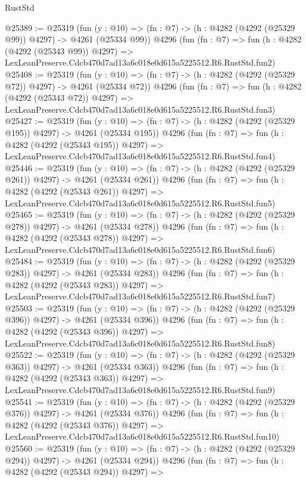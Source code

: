 \begin{lexlean}{RustStd}
\begin{coremodule}
@25389 := @25319
    (fun (y : @10) => (fn : @7) -> (h : @4282 (@4292 (@25329 @99)) @4297) -> @4261 (@25334 @99))
    @4296
    (fun (fn : @7) =>
    fun (h : @4282 (@4292 (@25343 @99)) @4297) =>
    LexLeanPreserve.Cdcb470d7ad13a6c018e0d615a5225512.R6.RustStd.fun2)
@25408 := @25319
    (fun (y : @10) => (fn : @7) -> (h : @4282 (@4292 (@25329 @72)) @4297) -> @4261 (@25334 @72))
    @4296
    (fun (fn : @7) =>
    fun (h : @4282 (@4292 (@25343 @72)) @4297) =>
    LexLeanPreserve.Cdcb470d7ad13a6c018e0d615a5225512.R6.RustStd.fun3)
@25427 := @25319
    (fun (y : @10) => (fn : @7) -> (h : @4282 (@4292 (@25329 @195)) @4297) -> @4261 (@25334 @195))
    @4296
    (fun (fn : @7) =>
    fun (h : @4282 (@4292 (@25343 @195)) @4297) =>
    LexLeanPreserve.Cdcb470d7ad13a6c018e0d615a5225512.R6.RustStd.fun4)
@25446 := @25319
    (fun (y : @10) => (fn : @7) -> (h : @4282 (@4292 (@25329 @261)) @4297) -> @4261 (@25334 @261))
    @4296
    (fun (fn : @7) =>
    fun (h : @4282 (@4292 (@25343 @261)) @4297) =>
    LexLeanPreserve.Cdcb470d7ad13a6c018e0d615a5225512.R6.RustStd.fun5)
@25465 := @25319
    (fun (y : @10) => (fn : @7) -> (h : @4282 (@4292 (@25329 @278)) @4297) -> @4261 (@25334 @278))
    @4296
    (fun (fn : @7) =>
    fun (h : @4282 (@4292 (@25343 @278)) @4297) =>
    LexLeanPreserve.Cdcb470d7ad13a6c018e0d615a5225512.R6.RustStd.fun6)
@25484 := @25319
    (fun (y : @10) => (fn : @7) -> (h : @4282 (@4292 (@25329 @283)) @4297) -> @4261 (@25334 @283))
    @4296
    (fun (fn : @7) =>
    fun (h : @4282 (@4292 (@25343 @283)) @4297) =>
    LexLeanPreserve.Cdcb470d7ad13a6c018e0d615a5225512.R6.RustStd.fun7)
@25503 := @25319
    (fun (y : @10) => (fn : @7) -> (h : @4282 (@4292 (@25329 @396)) @4297) -> @4261 (@25334 @396))
    @4296
    (fun (fn : @7) =>
    fun (h : @4282 (@4292 (@25343 @396)) @4297) =>
    LexLeanPreserve.Cdcb470d7ad13a6c018e0d615a5225512.R6.RustStd.fun8)
@25522 := @25319
    (fun (y : @10) => (fn : @7) -> (h : @4282 (@4292 (@25329 @363)) @4297) -> @4261 (@25334 @363))
    @4296
    (fun (fn : @7) =>
    fun (h : @4282 (@4292 (@25343 @363)) @4297) =>
    LexLeanPreserve.Cdcb470d7ad13a6c018e0d615a5225512.R6.RustStd.fun9)
@25541 := @25319
    (fun (y : @10) => (fn : @7) -> (h : @4282 (@4292 (@25329 @376)) @4297) -> @4261 (@25334 @376))
    @4296
    (fun (fn : @7) =>
    fun (h : @4282 (@4292 (@25343 @376)) @4297) =>
    LexLeanPreserve.Cdcb470d7ad13a6c018e0d615a5225512.R6.RustStd.fun10)
@25560 := @25319
    (fun (y : @10) => (fn : @7) -> (h : @4282 (@4292 (@25329 @294)) @4297) -> @4261 (@25334 @294))
    @4296
    (fun (fn : @7) =>
    fun (h : @4282 (@4292 (@25343 @294)) @4297) =>

\end{coremodule}
\end{lexlean}
